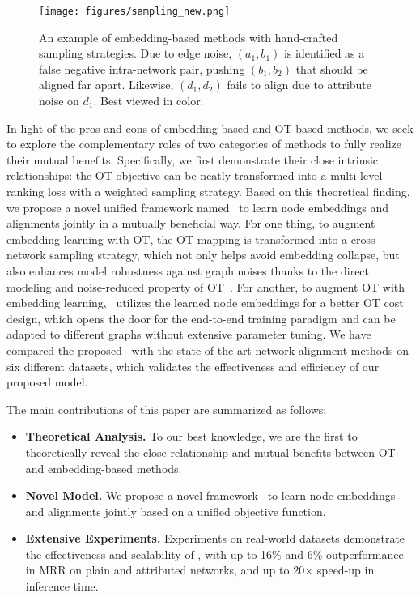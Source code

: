 \begin{figure}[t]
    \centering
    \texttt{[image: figures/sampling\_new.png]}
    \vspace{-15pt}
    \caption{An example of embedding-based methods with hand-crafted sampling strategies.
    Due to edge noise, $(a_1,b_1)$ is identified as a false negative intra-network pair, pushing $(b_1,b_2)$ that should be aligned far apart.
    Likewise, $(d_1,d_2)$ fails to align due to attribute noise on $d_1$. Best viewed in color.}
    \label{fig:sampling}
    \vspace{-10pt}
\end{figure}

In light of the pros and cons of embedding-based and OT-based methods, we seek to explore the complementary roles of two categories of methods to fully realize their mutual benefits. 
Specifically, we first demonstrate their close intrinsic relationships: the OT objective can be neatly transformed into a multi-level ranking loss with a weighted sampling strategy.
Based on this theoretical finding, we propose a novel unified framework named \algname\ to learn node embeddings and alignments jointly in a mutually beneficial way. 
For one thing, to augment embedding learning with OT, the OT mapping is transformed into a cross-network sampling strategy, which not only helps avoid embedding collapse, but also enhances model robustness against graph noises thanks to the direct modeling and noise-reduced property of OT~\cite{tam2019optimal,parrot}.
For another, to augment OT with embedding learning, \algname\ utilizes the learned node embeddings for a better OT cost design, which opens the door for the end-to-end training paradigm and can be adapted to different graphs without extensive parameter tuning.
We have compared the proposed \algname\ with the state-of-the-art network alignment methods on six different datasets, which validates the effectiveness and efficiency of our proposed model.

The main contributions of this paper are summarized as follows:
\begin{itemize}
    \item \textbf{Theoretical Analysis.} To our best knowledge, we are the first to theoretically reveal the close relationship and mutual benefits between OT and embedding-based methods.
    \item \textbf{Novel Model.} We propose a novel framework \algname\ to learn node embeddings and alignments jointly based on a unified objective function.
    \item \textbf{Extensive Experiments.}  Experiments on real-world datasets demonstrate the effectiveness and scalability of \algname, with up to 16\% and 6\% outperformance in MRR on plain and attributed networks, and up to 20$\times$ speed-up in inference time.
\end{itemize}
